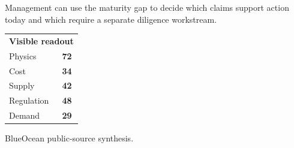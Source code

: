 \documentclass[10pt,a4paper]{article}
\begin{document}
\vspace{1pt}\noindent\begin{minipage}[t]{0.56\linewidth}
{\footnotesize\color{BOText} Management can use the maturity gap to decide which claims support action today and which require a separate diligence workstream.}\par
\end{minipage}\hfill\begin{minipage}[t]{0.36\linewidth}
{\scriptsize\color{BOText}\begin{tabular}{p{31mm}>{\raggedleft\arraybackslash}p{18mm}}
\multicolumn{2}{l}{\textcolor{BOGreen}{\bfseries Visible readout}}\\[2pt]
Physics & \textbf{72}\\[1pt]
Cost & \textbf{34}\\[1pt]
Supply & \textbf{42}\\[1pt]
Regulation & \textbf{48}\\[1pt]
Demand & \textbf{29}\\[1pt]
\end{tabular}}\par
\end{minipage}\par\vspace{1pt}
\par
{\scriptsize\color{BOMuted} BlueOcean public-source synthesis.}\par
\end{document}
